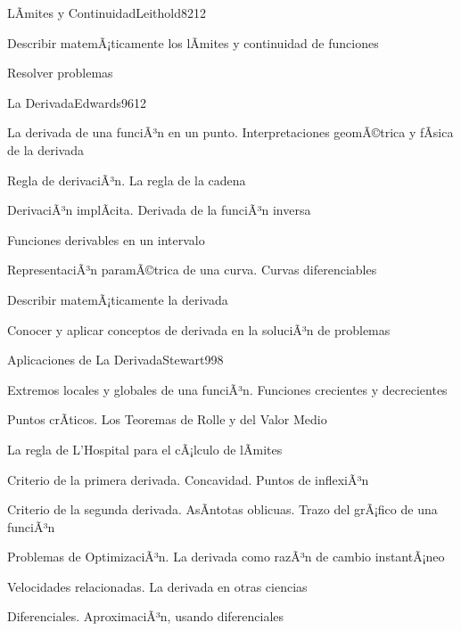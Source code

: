 \begin{syllabus}
\begin{unit}{LÃ­mites y Continuidad}{Leithold82}{12}
   \begin{unitgoals}
      \item Describir matemÃ¡ticamente los lÃ­mites y continuidad de funciones
	\item Resolver problemas
   \end{unitgoals}
\end{unit}

\begin{unit}{La Derivada}{Edwards96}{12}
\begin{topics}
	\item La derivada de una funciÃ³n en un punto. Interpretaciones geomÃ©trica y fÃ­sica de la derivada
	\item Regla de derivaciÃ³n. La regla de la cadena
	\item DerivaciÃ³n implÃ­cita. Derivada de la funciÃ³n inversa
	\item Funciones derivables en un intervalo
	\item RepresentaciÃ³n paramÃ©trica de una curva. Curvas diferenciables
\end{topics}

\begin{unitgoals}
	\item Describir matemÃ¡ticamente la derivada
	\item Conocer y aplicar conceptos de derivada en la soluciÃ³n de problemas
\end{unitgoals}
\end{unit}

\begin{unit}{Aplicaciones de La Derivada}{Stewart99}{8}
\begin{topics}
	\item Extremos locales y globales de una funciÃ³n. Funciones crecientes y decrecientes
	\item Puntos crÃ­ticos. Los Teoremas de Rolle y del Valor Medio
	\item La regla de L'Hospital para el cÃ¡lculo de lÃ­mites
	\item Criterio de la primera derivada. Concavidad. Puntos de inflexiÃ³n
	\item Criterio de la segunda derivada. AsÃ­ntotas oblicuas. Trazo del grÃ¡fico de una funciÃ³n
	\item Problemas de OptimizaciÃ³n. La derivada como razÃ³n de cambio instantÃ¡neo
	\item Velocidades relacionadas. La derivada en otras ciencias
	\item Diferenciales. AproximaciÃ³n, usando diferenciales
\end{topics}


\end{unit}
\end{syllabus}
